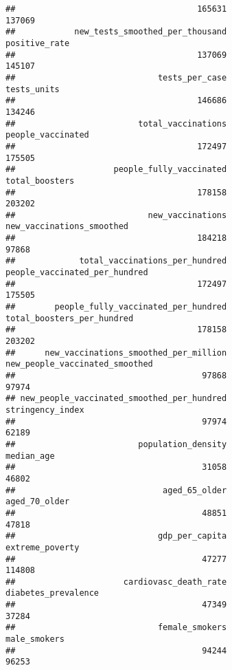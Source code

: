 \documentclass[
]{article}
\begin{document}
\begin{verbatim}
##                                     165631                                     137069 
##            new_tests_smoothed_per_thousand                              positive_rate 
##                                     137069                                     145107 
##                             tests_per_case                                tests_units 
##                                     146686                                     134246 
##                         total_vaccinations                          people_vaccinated 
##                                     172497                                     175505 
##                    people_fully_vaccinated                             total_boosters 
##                                     178158                                     203202 
##                           new_vaccinations                  new_vaccinations_smoothed 
##                                     184218                                      97868 
##             total_vaccinations_per_hundred              people_vaccinated_per_hundred 
##                                     172497                                     175505 
##        people_fully_vaccinated_per_hundred                 total_boosters_per_hundred 
##                                     178158                                     203202 
##      new_vaccinations_smoothed_per_million             new_people_vaccinated_smoothed 
##                                      97868                                      97974 
## new_people_vaccinated_smoothed_per_hundred                           stringency_index 
##                                      97974                                      62189 
##                         population_density                                 median_age 
##                                      31058                                      46802 
##                              aged_65_older                              aged_70_older 
##                                      48851                                      47818 
##                             gdp_per_capita                            extreme_poverty 
##                                      47277                                     114808 
##                      cardiovasc_death_rate                        diabetes_prevalence 
##                                      47349                                      37284 
##                             female_smokers                               male_smokers 
##                                      94244                                      96253 

\end{verbatim}
\end{document}
